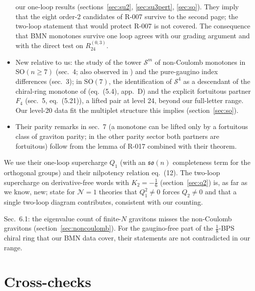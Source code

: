 \documentclass[11pt]{article}
\newcommand{\R}[1]{\textsf{R-0#1}}
\newcommand{\SO}{\mathrm{SO}}
\newcommand{\cN}{\mathcal{N}}
\begin{document}
\begin{description}[style=nextline,leftmargin=1.2em]
\begin{itemize}
our one-loop results (sections~\ref{sec:su2}, \ref{sec:su3pert}, \ref{sec:so}). They imply that the eight order-2
candidates of R-007 survive to the second page; the two-loop statement that would protect R-007 is not covered. The
consequence that BMN monotones survive one loop agrees with our grading argument and with the direct test on
$R_{24}^{(0,3)}$.
\item New relative to us: the study of the tower $\mathcal S^m$ of non-Coulomb monotones in $\SO(n\ge7)$ (sec.~4;
also observed in \cite{ChoiKim}) and the pure-gaugino index differences (sec.~3); in $\SO(7)$, the identification of
$\mathcal S^4$ as a descendant of the chiral-ring monotone of \cite{CLSduality,ChoiLee} (eq.~(5.4), app.~D) and the
explicit fortuitous partner $F_4$ (sec.~5, eq.~(5.21)), a lifted pair at level 24, beyond our full-letter range. Our level-20 data fit the multiplet structure this implies (section~\ref{sec:so}).
\item Their parity remarks in sec.~7 (a monotone can be lifted only by a fortuitous class of graviton parity; in the
other parity sector both partners are fortuitous) follow from the lemma of \R{17} combined with their theorem.
\end{itemize}
\item[Budzik, Kulp \cite{BK}.] We use their one-loop supercharge $Q_1$ (with an $\mathfrak{so}(n)$ completeness term for
the orthogonal groups) and their nilpotency relation eq.~(12). The two-loop supercharge on derivative-free words with
$K_2=-\tfrac16$ (section~\ref{sec:q2}) is, as far as we know, new; \cite{BGKWWY} state for $\cN=1$ theories that
$Q_1^2\ne0$ forces $Q_2\ne0$ and that a single two-loop diagram contributes, consistent with our counting.
\item[Kinney, Maldacena, Minwalla, Raju \cite{KMMR}.] Sec.~6.1: the eigenvalue count of finite-$N$ gravitons misses
the non-Coulomb gravitons (section~\ref{sec:noncoulomb}). For the gaugino-free part of the $\frac18$-BPS chiral ring
that our BMN data cover, their statements are not contradicted in our range.
\end{description}

\section{Cross-checks}\label{sec:checks}
\end{document}
